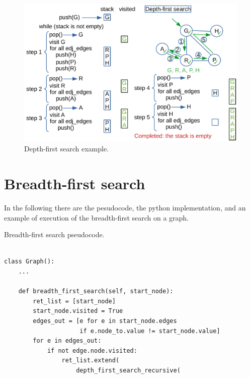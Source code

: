 \begin{figure}[H]
	\begin{center}
		\includegraphics[scale=.6]{chapters/appendix/images/appendixgraphs/graphsappendix_1.pdf}
		\caption[Depth-first search example.]{Depth-first search example.}
		\label{graphappendix_1}
	\end{center}
\end{figure}

\section{Breadth-first search}
In the following there are the pesudocode, the python implementation, and an example of execution of the breadth-first search on a graph.

\begin{algorithm}[H]
	\DontPrintSemicolon
	\LinesNumbered
\caption{Breadth-first search pseudocode.}
\end{algorithm}

\begin{lstlisting}[firstnumber=1, caption={Breadth-first search implementation on graphs.}]
		
class Graph():
	...
	
	def breadth_first_search(self, start_node):
		ret_list = [start_node]
		start_node.visited = True
		edges_out = [e for e in start_node.edges
					 if e.node_to.value != start_node.value]
		for e in edges_out:
			if not edge.node.visited:
				ret_list.extend(
					depth_first_search_recursive(
						
	
\end{lstlisting}

